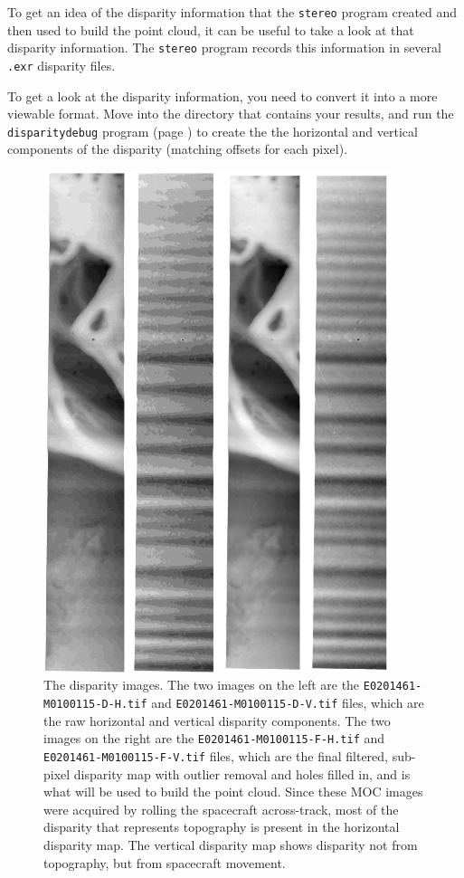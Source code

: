 To get an idea of the disparity information that the \texttt{stereo}
program created and then used to build the point cloud, it can be
useful to take a look at that disparity information.  The \texttt{stereo}
program records this information in several \texttt{.exr} disparity
files.

To get a look at the disparity information, you need to convert it
into a more viewable format.  Move into the directory that contains
your results, and run the \texttt{disparitydebug} program (page
\pageref{disparitydebug}) to create the the horizontal and vertical
components of the disparity (matching offsets for each pixel).

\begin{figure}[b!]
\begin{minipage}{4in}
\includegraphics[width=4in]{images/p19-disparity.png}
\end{minipage}
\hfill
\begin{minipage}{2.7in}
\caption[P19 disparity images]{
    \label{p19-disparity}
	The disparity images.  The two images on the left are the
	\texttt{E0201461-M0100115-D-H.tif} and
	\texttt{E0201461-M0100115-D-V.tif} files, which are the raw horizontal and
	vertical disparity components.  The two images on the right are the
	\texttt{E0201461-M0100115-F-H.tif} and
	\texttt{E0201461-M0100115-F-V.tif} files, which are the final
	filtered, sub-pixel disparity map with outlier removal and holes
	filled in, and is what will be used to build the point cloud.  Since
	these MOC images were acquired by rolling the spacecraft across-track,
	most of the disparity that represents topography is present in the
	horizontal disparity map.  The vertical disparity map shows disparity
	not from topography, but from spacecraft movement.
    }
\end{minipage}
\end{figure}

